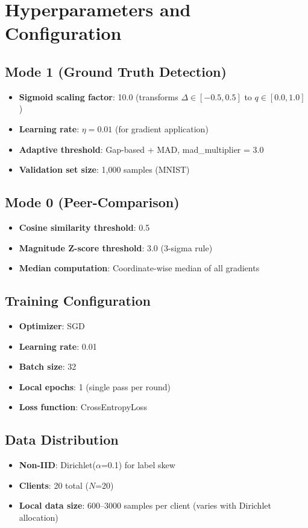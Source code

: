 \section{Hyperparameters and Configuration}

\subsection{Mode 1 (Ground Truth Detection)}
\begin{itemize}
    \item \textbf{Sigmoid scaling factor}: 10.0 (transforms $\Delta \in [-0.5, 0.5]$ to $q \in [0.0, 1.0]$)
    \item \textbf{Learning rate}: $\eta = 0.01$ (for gradient application)
    \item \textbf{Adaptive threshold}: Gap-based + MAD, mad\_multiplier = 3.0
    \item \textbf{Validation set size}: 1,000 samples (MNIST)
\end{itemize}

\subsection{Mode 0 (Peer-Comparison)}
\begin{itemize}
    \item \textbf{Cosine similarity threshold}: 0.5
    \item \textbf{Magnitude Z-score threshold}: 3.0 (3-sigma rule)
    \item \textbf{Median computation}: Coordinate-wise median of all gradients
\end{itemize}

\subsection{Training Configuration}
\begin{itemize}
    \item \textbf{Optimizer}: SGD
    \item \textbf{Learning rate}: 0.01
    \item \textbf{Batch size}: 32
    \item \textbf{Local epochs}: 1 (single pass per round)
    \item \textbf{Loss function}: CrossEntropyLoss
\end{itemize}

\subsection{Data Distribution}
\begin{itemize}
    \item \textbf{Non-IID}: Dirichlet($\alpha$=0.1) for label skew
    \item \textbf{Clients}: 20 total ($N$=20)
    \item \textbf{Local data size}: 600--3000 samples per client (varies with Dirichlet allocation)
\end{itemize}

